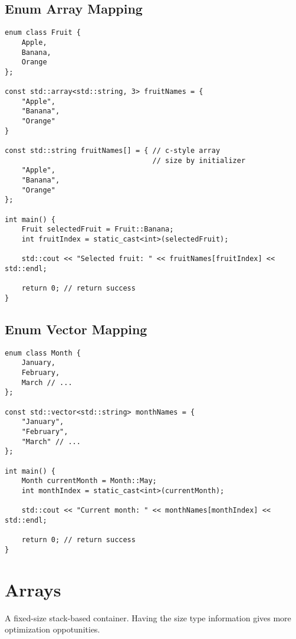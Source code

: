 \documentclass[openany]{report}
\begin{document}
\subsection{Enum Array Mapping}

\begin{verbatim}
enum class Fruit {
    Apple,
    Banana,
    Orange
};

const std::array<std::string, 3> fruitNames = {
    "Apple",
    "Banana",
    "Orange"
}

const std::string fruitNames[] = { // c-style array
                                   // size by initializer
    "Apple",
    "Banana",
    "Orange"
};

int main() {
    Fruit selectedFruit = Fruit::Banana;
    int fruitIndex = static_cast<int>(selectedFruit);

    std::cout << "Selected fruit: " << fruitNames[fruitIndex] << std::endl;

    return 0; // return success
}
\end{verbatim}

\subsection{Enum Vector Mapping}

\begin{verbatim}
enum class Month {
    January,
    February,
    March // ...
};

const std::vector<std::string> monthNames = {
    "January",
    "February",
    "March" // ... 
};

int main() {
    Month currentMonth = Month::May;
    int monthIndex = static_cast<int>(currentMonth);

    std::cout << "Current month: " << monthNames[monthIndex] << std::endl;

    return 0; // return success
}
\end{verbatim}


\section{Arrays}

A fixed-size stack-based container. Having the size type information gives more optimization oppotunities.
\end{document}
